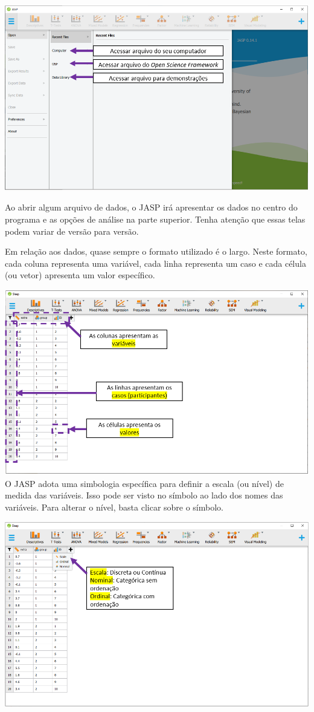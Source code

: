 \documentclass[
]{book}
\begin{document}
\includegraphics{./img/cap_jasp_abrir2.png}

Ao abrir algum arquivo de dados, o JASP irá apresentar os dados no
centro do programa e as opções de análise na parte superior. Tenha
atenção que essas telas podem variar de versão para versão.

Em relação aos dados, quase sempre o formato utilizado é o largo. Neste
formato, cada coluna representa uma variável, cada linha representa um
caso e cada célula (ou vetor) apresenta um valor específico.

\includegraphics{./img/cap_jasp_dados.png} O JASP adota uma simbologia
específica para definir a escala (ou nível) de medida das variáveis.
Isso pode ser visto no símbolo ao lado dos nomes das variáveis. Para
alterar o nível, basta clicar sobre o símbolo.

\includegraphics{./img/cap_jasp_tipo_de_dados.png}
\end{document}
